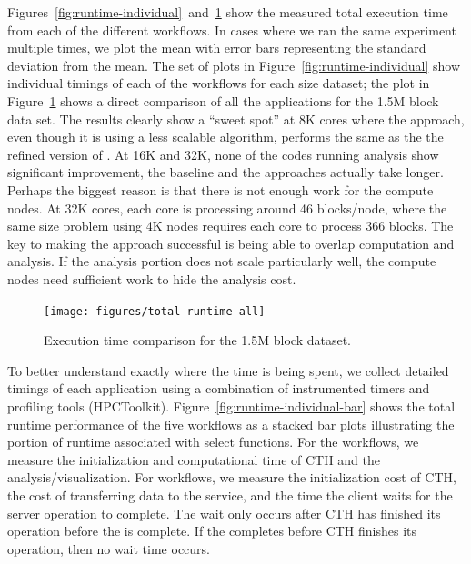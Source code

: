 Figures~\ref{fig:runtime-individual}~and~\ref{fig:runtime-total} show the
measured total execution time from each of the different workflows.  In cases
where we ran the same experiment multiple times, we plot the mean with error
bars representing the standard deviation from the mean. The set of plots in
Figure~\ref{fig:runtime-individual} show individual timings of each of the
workflows for each size dataset; the plot  in Figure~\ref{fig:runtime-total}
shows a direct comparison of all the  applications for the 1.5M block data set.
The results clearly show a ``sweet spot'' at 8K cores where the \intransit
approach, even though it is using a less scalable algorithm, performs the same
as the the refined version of \insitu.  At 16K and 32K, none of the codes
running analysis show significant improvement, the baseline \insitu and the
\intransit approaches actually take longer.  Perhaps the biggest reason is that
there is not enough work for the compute nodes.  At 32K cores, each core is
processing around 46 blocks/node, where the same size problem using 4K
nodes requires each core to process 366 blocks.  The key to making the
\intransit approach successful is being able to overlap computation and
analysis.  If the analysis portion does not scale particularly well, the
compute nodes need sufficient work to hide the analysis cost.

\begin{figure}[htbp]
\begin{centering}
\texttt{[image: figures/total-runtime-all]}
\caption{Execution time comparison for the 1.5M block dataset.}
\label{fig:runtime-total}
\par\end{centering}
\end{figure}

To better understand exactly where the time is being spent, we collect
detailed timings of each application using a combination of instrumented timers
and profiling tools (HPCToolkit).  Figure~\ref{fig:runtime-individual-bar} shows
the total runtime performance of the five workflows as a stacked bar plots
illustrating the portion of runtime associated with select functions.  For the
\insitu workflows, we measure the initialization and computational time of
CTH and the analysis/visualization.  For \intransit workflows, we measure
the initialization cost of CTH, the cost of transferring data to the service,
and the time the client waits for the server operation to complete. The wait
only occurs after CTH has finished its operation before the \vda is
complete.  If the \vda completes before CTH finishes its operation, then no
wait time occurs.

